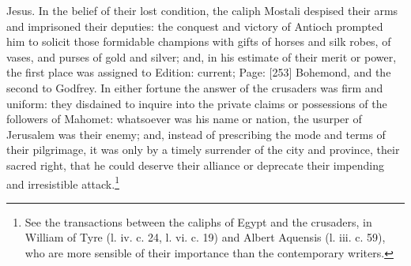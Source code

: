 Jesus. In the belief of their lost condition, the caliph Mostali despised their arms and imprisoned their deputies: the conquest and victory of Antioch prompted him to solicit those formidable champions with gifts of horses and silk robes, of vases, and purses of gold and silver; and, in his estimate of their merit or power, the first place was assigned to Edition: current; Page: [253] Bohemond, and the second to Godfrey. In either fortune the answer of the crusaders was firm and uniform: they disdained to inquire into the private claims or possessions of the followers of Mahomet: whatsoever was his name or nation, the usurper of Jerusalem was their enemy; and, instead of prescribing the mode and terms of their pilgrimage, it was only by a timely surrender of the city and province, their sacred right, that he could deserve their alliance or deprecate their impending and irresistible attack.\footnote{See the transactions between the caliphs of Egypt and the crusaders, in William of Tyre (l. iv. c. 24, l. vi. c. 19) and Albert Aquensis (l. iii. c. 59), who are more sensible of their importance than the contemporary writers.}

